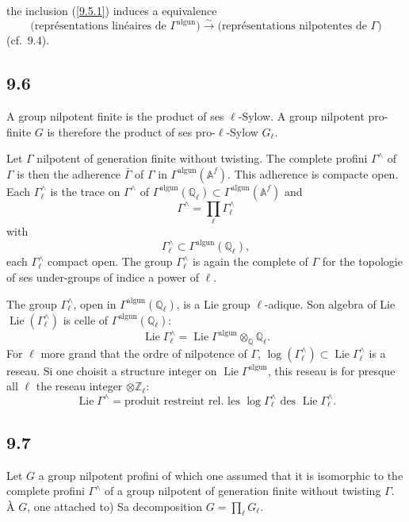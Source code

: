 \documentclass[12pt,a4paper]{article}
\theoremstyle{plain}
\theoremstyle{definition}
\theoremstyle{remark}
\DeclareMathOperator{\Lie}{Lie}
\newcommand{\Q}{\mathbb{Q}}
\newcommand{\Z}{\mathbb{Z}}
\newcommand{\Af}{\mathbb{A}^f}
\newcommand{\alg}{\mathrm{alg}}
\newcommand{\un}{\mathrm{un}}
\begin{document}
the inclusion (\ref{9.5.1}) induces a equivalence
$$\text{(repr\'esentations lin\'eaires de $\Gamma^{\alg \un}$)} \xrightarrow{\sim} \text{(repr\'esentations nilpotentes de $\Gamma$)}$$
(cf.~9.4).

\subsection*{9.6}

A group nilpotent finite is the product of ses $\ell$-Sylow. A group nilpotent pro-finite $G$ is therefore the product of ses pro-$\ell$-Sylow $G_\ell$.

Let $\Gamma$ nilpotent of generation finite without twisting. The complete profini $\Gamma^\wedge$ of $\Gamma$ is then the adherence $\bar{\Gamma}$ of $\Gamma$ in $\Gamma^{\alg \un}(\Af)$. This adherence is compacte open. Each $\Gamma^\wedge_\ell$ is the trace on $\Gamma^\wedge$ of $\Gamma^{\alg \un}(\Q_\ell) \subset \Gamma^{\alg \un}(\Af)$ and
$$\Gamma^\wedge = \prod_\ell \Gamma^\wedge_\ell$$
with
$$\Gamma^\wedge_\ell \subset \Gamma^{\alg \un}(\Q_\ell),$$
each $\Gamma^\wedge_\ell$ compact open. The group $\Gamma^\wedge_\ell$ is again the complete of $\Gamma$ for the topologie of ses under-groups of indice a power of $\ell$.

The group $\Gamma^\wedge_\ell$, open in $\Gamma^{\alg \un}(\Q_\ell)$, is a Lie group $\ell$-adique. Son algebra of Lie $\Lie(\Gamma^\wedge_\ell)$ is celle of $\Gamma^{\alg \un}(\Q_\ell)$:
\begin{equation}\label{9.6.1}
\Lie \Gamma^\wedge_\ell = \Lie \Gamma^{\alg \un} \otimes_\Q \Q_\ell. \tag{9.6.1}
\end{equation}
For $\ell$ more grand that the ordre of nilpotence of $\Gamma$, $\log(\Gamma^\wedge_\ell) \subset \Lie \Gamma^\wedge_\ell$ is a reseau. Si one choisit a structure integer on $\Lie \Gamma^{\alg \un}$, this reseau is for presque all $\ell$ the reseau integer $\otimes \Z_\ell$:
$$\Lie \Gamma^\wedge = \text{produit restreint rel.~les } \log \Gamma^\wedge_\ell \text{ des } \Lie \Gamma^\wedge_\ell.$$

\subsection*{9.7}

Let $G$ a group nilpotent profini of which one assumed that it is isomorphic to the complete profini $\Gamma^\wedge$ of a group nilpotent of generation finite without twisting $\Gamma$. \`A $G$, one attached to) Sa decomposition $G = \prod_\ell G_\ell$.
\end{document}
